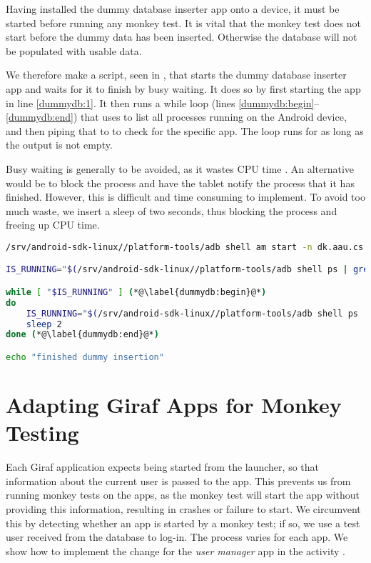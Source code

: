 Having installed the dummy database inserter app onto a device, it must be started before running any monkey test. It is vital that the monkey test does not start before the dummy data has been inserted. Otherwise the database will not be populated with usable data.

We therefore make a script, seen in , that starts the dummy database inserter app and waits for it to finish by busy waiting. It does so by first starting the app in line \ref{dummydb:1}. It then runs a while loop (lines \ref{dummydb:begin}--\ref{dummydb:end}) that uses  to list all processes running on the Android device, and then piping that to  to check for the specific app. The loop runs for as long as the output is not empty.

Busy waiting is generally to be avoided, as it wastes CPU time \parencite[ch.2]{tanenbaum2007}. An alternative would be to block the process and have the tablet notify the process that it has finished. However, this is difficult and time consuming to implement. To avoid too much waste, we insert a sleep of two seconds, thus blocking the process and freeing up CPU time.

\begin{lstlisting}[language=bash,showstringspaces=false,caption=Start and wait for dummy database inserter,label=lst:start_wait_dummy_db_inserter]
/srv/android-sdk-linux//platform-tools/adb shell am start -n dk.aau.cs.giraf.dummydbinserter/dk.aau.cs.giraf.dummydbinserter.MainActivity (*@\label{dummydb:1}@*)

IS_RUNNING="$(/srv/android-sdk-linux//platform-tools/adb shell ps | grep dk.aau.cs.giraf.dummydbinserter)"

while [ "$IS_RUNNING" ] (*@\label{dummydb:begin}@*)
do
    IS_RUNNING="$(/srv/android-sdk-linux//platform-tools/adb shell ps | grep dk.aau.cs.giraf.dummydbinserter)"
    sleep 2
done (*@\label{dummydb:end}@*)

echo "finished dummy insertion"
\end{lstlisting}

\section{Adapting Giraf Apps for Monkey Testing}\label{sec:adapting_apps_for_monkey_testing}
Each Giraf application expects being started from the launcher, so that information about the current user is passed to the app. This prevents us from running monkey tests on the apps, as the monkey test will start the app without providing this information, resulting in crashes or failure to start. We circumvent this by detecting whether an app is started by a monkey test; if so, we use a test user received from the database to log-in. The process varies for each app. We show how to implement the change for the \emph{user manager} app in the activity .

